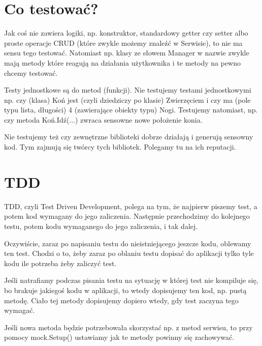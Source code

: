 \documentclass[10pt]{article}
\begin{document}
\section{Co testować?}
Jak coś nie zawiera logiki, np. konstruktor, standardowy getter czy setter albo proste operacje CRUD (które zwykle możemy znaleźć w Serwisie), to nie ma sensu tego testować. Natomiast np. klasy ze słowem Manager w nazwie zwykle mają metody które reagują na działania użytkownika i te metody na pewno chcemy testować.

Testy jednostkowe są do metod (funkcji). Nie testujemy testami jednostkowymi np. czy (klasa) Koń jest (czyli dziedziczy po klasie) Zwierzęciem i czy ma (pole typu lista, długości) 4 (zawierające obiekty typu) Nogi. Testujemy natomiast, np. czy metoda Koń.Idź(...) zwraca sensowne nowe położenie konia.

Nie testujemy też czy zewnętrzne biblioteki dobrze działają i generują sensowny kod. Tym zajmują się twórcy tych bibliotek. Polegamy tu na ich reputacji.

\section{TDD}
TDD, czyli Test Driven Development, polega na tym, że najpierw piszemy test, a potem kod wymagany do jego zaliczenia. Następnie przechodzimy do kolejnego testu, potem kodu wymaganego do jego zaliczenia, i tak dalej.

Oczywiście, zaraz po napisaniu testu do nieistniejącego jeszcze kodu, oblewamy ten test. Chodzi o to, żeby zaraz po oblaniu testu dopisać do aplikacji tylko tyle kodu ile potrzeba żeby zaliczyć test.

Jeśli natrafiamy podczas pisania testu na sytuację w której test nie kompiluje się, bo brakuje jakiegoś kodu w aplikacji, to wtedy dopisujemy ten kod, np. pustą metodę. Ciało tej metody dopisujemy dopiero wtedy, gdy test zaczyna tego wymagać.

Jeśli nowa metoda będzie potrzebowała skorzystać np. z metod serwisu, to przy pomocy mock.Setup() ustawiamy jak te metody powinny się zachowywać.
\end{document}
